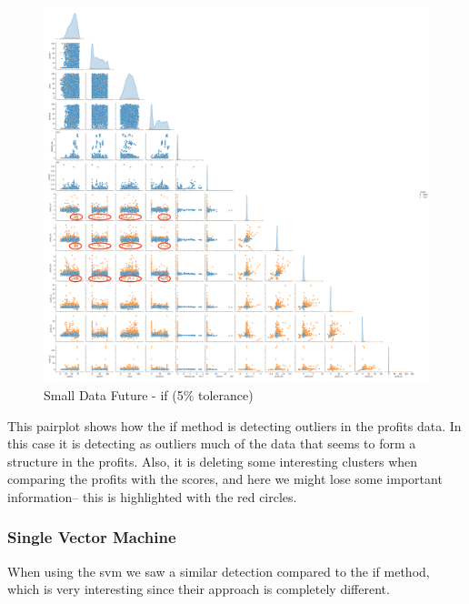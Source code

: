 \documentclass[11pt,english,a4paper,hidelinks]{book}
\begin{document}
\begin{figure}[H]
    \centering
    \includegraphics[width=1\textwidth]{images/code/outliers/Small Data future - IF.png}
    \caption{Small Data Future - \acrshort{if} (5\% tolerance)}
    \label{fig:small_data_future_if}
\end{figure}

\noindent This \acrshort{pairplot} shows how the \acrshort{if} method is detecting outliers in the profits data. In this case it is detecting as outliers much of the data that seems to form a structure in the profits. Also, it is deleting some interesting clusters when comparing the profits with the scores, and here we might lose some important information-- this is highlighted with the red circles.

\newpage

\subsubsection{Single Vector Machine}

When using the \acrshort{svm} we saw a similar detection compared to the \acrshort{if} method, which is very interesting since their approach is completely different.
\end{document}
